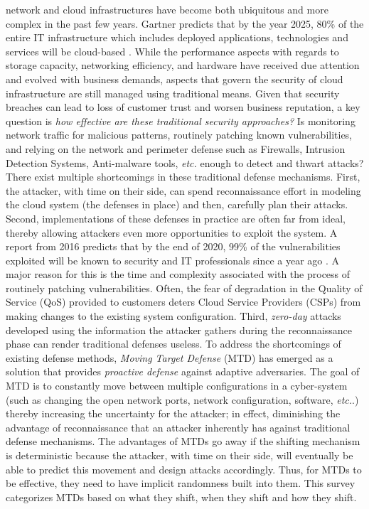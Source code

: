


 network and cloud infrastructures have become both ubiquitous and more complex in the past few years. Gartner predicts that by the year 2025, 80\% of the entire IT infrastructure which includes deployed applications, technologies and services will be cloud-based . 
While the performance aspects with regards to storage capacity, networking efficiency, and hardware have received due attention and evolved with business demands, aspects that govern the security of cloud infrastructure are still managed using traditional means. Given that security breaches can lead to loss of customer trust and worsen business reputation, a key question is \emph{how effective are these traditional security approaches?} Is monitoring network traffic for malicious patterns, routinely patching known vulnerabilities, and relying on the network and perimeter defense such as Firewalls, Intrusion Detection Systems, Anti-malware tools, {\em etc.} enough to detect and thwart attacks?
There exist multiple shortcomings in these traditional defense mechanisms. First, the attacker, with time on their side, can spend reconnaissance effort in modeling the cloud system (the defenses in place) and then, carefully plan their attacks. Second, implementations of these defenses in practice are often far from ideal, thereby allowing attackers even more opportunities to exploit the system. A report from 2016 predicts that by the end of 2020, 99\% of the vulnerabilities exploited will be known to security and IT professionals since a year ago . A major reason for this is the time and complexity associated with the process of routinely patching vulnerabilities. Often, the fear of degradation in the Quality of Service (QoS) provided to customers deters Cloud Service Providers (CSPs) from making changes to the existing system configuration. Third, {\em zero-day} attacks developed using the information the attacker gathers during the reconnaissance phase can render traditional defenses useless.
To address the shortcomings of existing defense methods, \emph{Moving Target Defense} (MTD) has emerged as a solution that provides \emph{proactive defense} against adaptive adversaries. The goal of MTD is to constantly move between multiple configurations in a cyber-system (such as changing the open network ports, network configuration, software, {\em etc.}.) thereby increasing the uncertainty for the attacker; in effect, diminishing the advantage of reconnaissance that an attacker inherently has against traditional defense mechanisms. The advantages of MTDs go away if the shifting mechanism is deterministic because the attacker, with time on their side, will eventually be able to predict this movement and design attacks accordingly. Thus, for MTDs to be effective, they need to have implicit randomness built into them.  This survey categorizes MTDs based on what they shift, when they shift and how they shift. 
